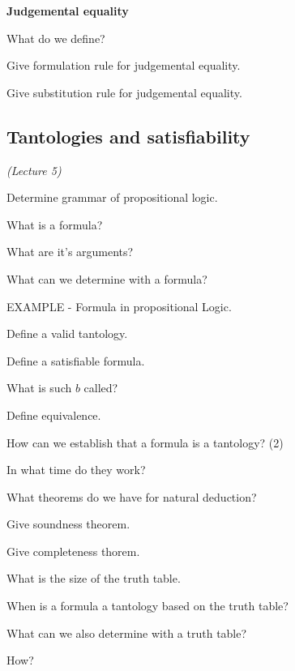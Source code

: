 \documentclass[fleqn]{article}
\begin{document}
\textbf{Judgemental equality}
\begin{enumerate}
    {\color{red}\item What do we define?}
    {\color{blue}\item Give formulation rule for judgemental equality.}
    {\color{blue}\item Give substitution rule for judgemental equality.}
\end{enumerate}


\subsection{Tantologies and satisfiability}
\textit{(Lecture 5)}
\begin{enumerate}
    {\color{red}\item Determine grammar of propositional logic.}
    {\color{red}\item What is a formula?}
    {\color{red}\item What are it's arguments?}
    {\color{red}\item What can we determine with a formula?}
    {\color{red}\item EXAMPLE - Formula in propositional Logic.}
    {\color{red}\item Define a valid tantology.}
    {\color{red}\item Define a satisfiable formula.}
    {\color{red}\item What is such $b$ called?}
    {\color{red}\item Define equivalence.}
    {\color{red}\item How can we establish that a formula is a tantology? (2)}
    \item In what time do they work?
    \item What theorems do we have for natural deduction?
    {\color{red}\item Give soundness theorem.}
    {\color{red}\item Give completeness thorem.}
    {\color{red}\item What is the size of the truth table.}
    \item When is a formula a tantology based on the truth table?
    \item What can we also determine with a truth table?
    \item How?
\end{enumerate}

\end{document}
